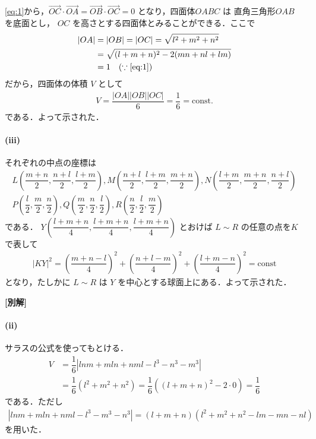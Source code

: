 \documentclass[../../main.tex]{subfiles}
\begin{document}
\cref{eq:1}から，$\overrightarrow{OC}\cdot\overrightarrow{OA} = \overrightarrow{OB}\cdot\overrightarrow{OC} = 0$ となり，四面体$OABC$ は 直角三角形$OAB$ を底面とし， $OC$ を高さとする四面体とみることができる．ここで
\begin{align}
  |OA|
  &= |OB| = |OC| = \sqrt{l^2+m^2+n^2} \\
  &= \sqrt{(l+m+n)^2 - 2(mn+nl+lm)} \\
  &= 1 \quad (\because \text{\cref{eq:1}})
\end{align}
だから，四面体の体積 $V$ として
\begin{align}
  V = \dfrac{|OA||OB||OC|}{6} = \dfrac{1}{6} = \text{const.}
\end{align}
である．よって示された．

\paragraph{(iii)}

それぞれの中点の座標は
\begin{align}
  L\left(\dfrac{m+n}{2}, \dfrac{n+l}{2}, \dfrac{l+m}{2}\right),
  M\left(\dfrac{n+l}{2}, \dfrac{l+m}{2}, \dfrac{m+n}{2}\right),
  N\left(\dfrac{l+m}{2}, \dfrac{m+n}{2}, \dfrac{n+l}{2}\right) \\
  P\left(\dfrac{l}{2}, \dfrac{m}{2}, \dfrac{n}{2}\right),
  Q\left(\dfrac{m}{2}, \dfrac{n}{2}, \dfrac{l}{2}\right),
  R\left(\dfrac{n}{2}, \dfrac{l}{2}, \dfrac{m}{2}\right)
\end{align}
である．
$Y\left(\dfrac{l+m+n}{4}, \dfrac{l+m+n}{4}, \dfrac{l+m+n}{4}\right)$ とおけば
$L \sim R$ の任意の点を$K$で表して
\begin{align}
  |KY|^2 = \left(\dfrac{m+n-l}{4}\right)^2 + \left(\dfrac{n+l-m}{4}\right)^2 + \left(\dfrac{l+m-n}{4}\right)^2 = \text{const}
\end{align}
となり，たしかに $L \sim R$ は $Y$ を中心とする球面上にある．よって示された．

{\bf [別解]}

\paragraph{(ii)}
サラスの公式を使ってもとける．
\begin{align}
  V &= \dfrac{1}{6} \left| lnm + mln + nml - l^3 - n^3 - m^3 \right| \\
  &= \dfrac{1}{6} (l^2+m^2+n^2) = \dfrac{1}{6} ((l+m+n)^2-2\cdot 0) = \dfrac{1}{6}
\end{align}
である．ただし
\begin{align}
  \left| lnm+mln+nml - l^3-m^3-n^3 \right| = (l+m+n)(l^2+m^2+n^2-lm-mn-nl)
\end{align}
を用いた．
\end{document}
